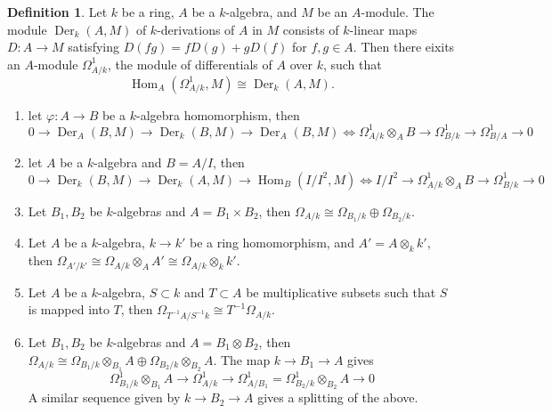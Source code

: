 \documentclass[leqno]{amsart}
\DeclareMathOperator{\Der}{Der}
\newcommand{\1}{\mathbf{1}}
\DeclareMathOperator{\Hom}{Hom}
\theoremstyle{definition}
\newtheorem{defn}[thm]{Definition}
\theoremstyle{remark}
\begin{document}
\begin{defn}
	Let $k$ be a ring, $A$ be a $k$-algebra,
	and $M$ be an  $A$-module.
	The module $\Der_k(A,M)$ of $k$-derivations of  $A$ in  $M$
	consists of $k$-linear maps $D\colon A\to M$
	satisfying $D(fg)=fD(g)+gD(f)$ for  $f,g\in A$.
	Then there eixits an  $A$-module  $\Omega^1_{A/k}$,
	the module of differentials of $A$ over  $k$,
	such that 
	 \[
		 \Hom_A(\Omega^1_{A/k},M)\cong \Der_k(A,M).
	\]
\end{defn}
\begin{enumerate}[label=(\alph*)]
	\item let $\varphi\colon A\to B$ be a 
		$k$-algebra homomorphism, then
		\[
		0\to \Der_A(B,M)\to \Der_k(B,M)\to \Der_A(B,M)
		\Longleftrightarrow
		\Omega^1_{A/k}\otimes_AB\to \Omega^1_{B/k}
		\to \Omega^1_{B/A}\to 0
		\]
	\item let $A$ be a  $k$-algebra and  $B=A/I$, then
		 \[
		 0\to \Der_k(B,M)\to \Der_k(A,M)\to\Hom_B(I/I^2,M)
		 \Longleftrightarrow
		 I/I^2\to \Omega^1_{A/k}\otimes_AB\to 
		 \Omega^1_{B/k}\to 0
		\]
	\item Let $B_1,B_2$ be  $k$-algebras and 
		 $A=B_1\times B_2$, then
		 $\Omega_{A/k}\cong
		 \Omega_{B_1/k}\oplus\Omega_{B_2/k}$.
	\item Let $A$ be a $k$-algebra,
	$k\to k'$ be a ring homomorphism,
	and $A'=A\otimes_kk'$, then
	$\Omega_{A'/k'}
	\cong\Omega_{A/k}\otimes_AA'
	\cong\Omega_{A/k}\otimes_kk'$.
	\item Let $A$ be a  $k$-algebra, 
	$S\subset k$ and  $T\subset A$ be multiplicative subsets
	such that $S$ is mapped into $T$,
	then $\Omega_{T^{-1}A/S^{-1}k}\cong T^{-1}\Omega_{A/k}$.
	\item Let $B_1,B_2$ be  $k$-algebras and 
	$A=B_1\otimes B_2$, then
	$\Omega_{A/k}\cong 
	\Omega_{B_1/k}\otimes_{B_1}A\oplus
	\Omega_{B_2/k}\otimes_{B_2}A$.
	The map $k\to B_1\to A$ gives
	 \[
		\Omega^1_{B_1/k}\otimes_{B_1}A\to 
		\Omega^1_{A/k}\to \Omega^1_{A/B_1}=
		\Omega^1_{B_2/k}\otimes_{B_2}A\to 0
	\]
	A similar sequence given by $k\to B_2\to A$
	gives a splitting of the above.
\end{enumerate}
\end{document}

